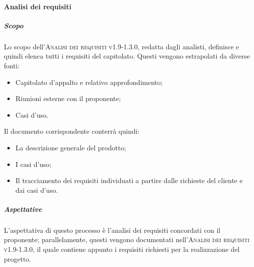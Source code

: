 \documentclass[../norme-di-progetto.tex]{subfiles}
\begin{document}
\paragraph{Analisi dei requisiti}
\subparagraph{Scopo}
Lo scopo dell'\textsc{Analisi dei requisiti v1.9-1.3.0}, redatta dagli analisti, definisce e quindi elenca tutti i requisiti del capitolato. Questi vengono estrapolati da diverse fonti:
\begin{itemize}
  \item Capitolato d'appalto e relativo approfondimento;
  \item Riunioni esterne con il proponente;
  \item Casi d'uso.
\end{itemize}
Il documento corrispondente conterrà quindi:
\begin{itemize}
  \item La descrizione generale del prodotto;
  \item I casi d'uso;
  \item Il tracciamento dei requisiti individuati a partire dalle richieste del cliente e dai casi d'uso.
\end{itemize}

\subparagraph{Aspettative}
L'aspettativa di questo processo è l'analisi dei requisiti concordati con il proponente; parallelamente, questi vengono documentati nell'\textsc{Analisi dei requisiti v1.9-1.3.0}, il quale contiene appunto i requisiti richiesti per la realizzazione del progetto.
\end{document}
